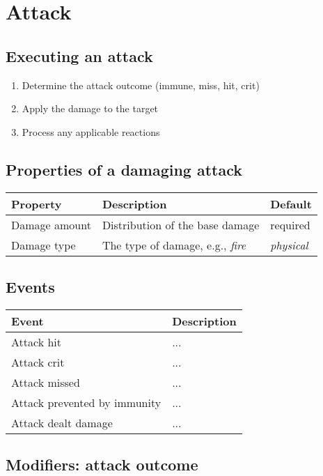 \section{Attack}
\label{sec:attack}

\subsection{Executing an attack}

\begin{enumerate}
	\item  Determine the attack outcome (immune, miss, hit, crit)
	\item  Apply the damage to the target
	\item  Process any applicable reactions
\end{enumerate}

\subsection{Properties of a damaging attack}

\begin{tabular}{p{4cm} l l}
\toprule
Property & Description & Default \\
\midrule
Damage amount & Distribution of the base damage & required \\
Damage type & The type of damage, e.g., \emph{fire} & \emph{physical} \\
\bottomrule
\end{tabular}

\subsection{Events}



\begin{tabular}{p{6cm} p{8cm}}
\toprule
Event & Description \\
\midrule
Attack hit & ... \\
Attack crit & ... \\
Attack missed & ... \\
Attack prevented by immunity & ... \\
Attack dealt damage & ... \\
\bottomrule
\end{tabular}

\subsection{Modifiers: attack outcome}

